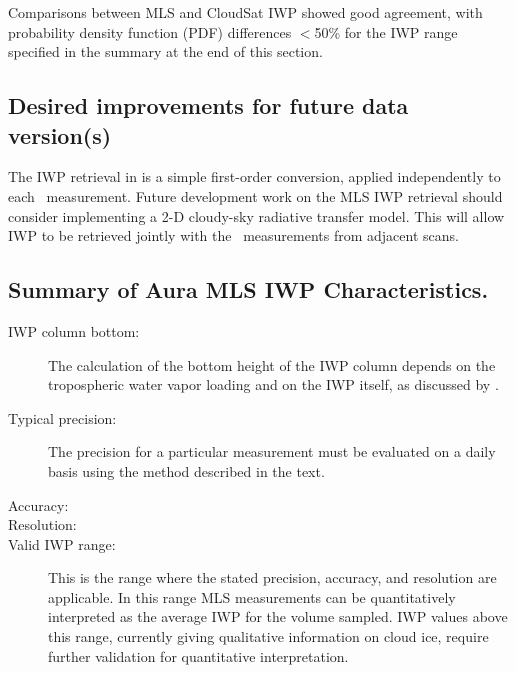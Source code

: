 Comparisons between \vii MLS and CloudSat IWP showed good agreement, with probability density function (PDF) differences $<$50\% for the IWP range specified in the summary at the end of this section.

\subsection{Desired improvements for future data version(s)}

The IWP retrieval in \thisv is a simple first-order conversion, applied independently to each \Tcir\ measurement. Future development work on the MLS IWP retrieval should consider implementing a 2-D cloudy-sky radiative transfer model. This will allow IWP to be retrieved jointly with the \Tcir\ measurements from adjacent scans.

\subsection{Summary of Aura MLS \thisv IWP Characteristics.}
\begin{description}
  \item[IWP column bottom:]  The calculation of the bottom height of the IWP column depends on the tropospheric water vapor loading and on the IWP itself, as discussed by \citet{WuEtal:2009}.
  \item[Typical precision:]  The precision for a particular measurement must be evaluated on a daily basis using the method described in the text.
  \item[Accuracy:] 
  \item[Resolution:] 
  \item[Valid IWP range:]  This is the range where the stated precision, accuracy, and resolution are applicable. In this range MLS measurements can be quantitatively interpreted as the average IWP for the volume sampled. IWP values above this range, currently giving qualitative information on cloud ice, require further validation for quantitative interpretation.
\end{description}

